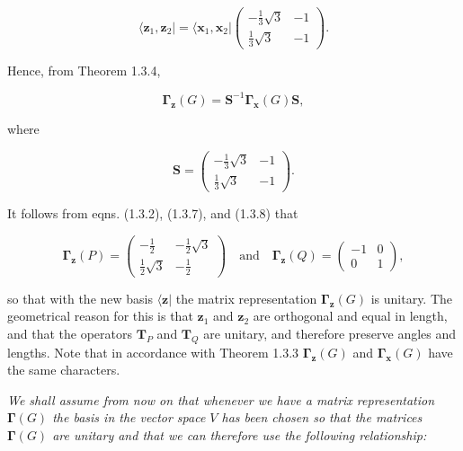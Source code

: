 \documentclass[11pt,a4paper,twoside,openright]{book}
\begin{document}
\begin{equation*}
\langle \mathbf{z}_{1}, \mathbf{z}_{2}| = \langle \mathbf{x}_{1}, \mathbf{x}_{2}| \begin{pmatrix} -\frac{1}{3}\sqrt{3} & -1 \\ \frac{1}{3}\sqrt{3} & -1 \end{pmatrix}. \tag{1.3.6}
\end{equation*}

Hence, from Theorem 1.3.4,

\begin{equation*}
\boldsymbol{\Gamma}_{\mathbf{z}}(G) = \mathbf{S}^{-1}\boldsymbol{\Gamma}_{\mathbf{x}}(G)\mathbf{S}, \tag{1.3.7}
\end{equation*}

where

\begin{equation*}
\mathbf{S} = \begin{pmatrix} -\frac{1}{3}\sqrt{3} & -1 \\ \frac{1}{3}\sqrt{3} & -1 \end{pmatrix}. \tag{1.3.8}
\end{equation*}

It follows from eqns. (1.3.2), (1.3.7), and (1.3.8) that

\begin{equation*}
\boldsymbol{\Gamma}_{\mathbf{z}}(P) = \begin{pmatrix} -\frac{1}{2} & -\frac{1}{2}\sqrt{3} \\ \frac{1}{2}\sqrt{3} & -\frac{1}{2} \end{pmatrix} \quad \text{and} \quad \boldsymbol{\Gamma}_{\mathbf{z}}(Q) = \begin{pmatrix} -1 & 0 \\ 0 & 1 \end{pmatrix}, \tag{1.3.9}
\end{equation*}

so that with the new basis $\langle \mathbf{z}|$ the matrix representation $\boldsymbol{\Gamma}_{\mathbf{z}}(G)$ is unitary. The geometrical reason for this is that $\mathbf{z}_{1}$ and $\mathbf{z}_{2}$ are orthogonal and equal in length, and that the operators $\mathbf{T}_{P}$ and $\mathbf{T}_{Q}$ are unitary, and therefore preserve angles and lengths. Note that in accordance with Theorem 1.3.3 $\boldsymbol{\Gamma}_{\mathbf{z}}(G)$ and $\boldsymbol{\Gamma}_{\mathbf{x}}(G)$ have the same characters.

\textit{We shall assume from now on that whenever we have a matrix representation $\boldsymbol{\Gamma}(G)$ the basis in the vector space $V$ has been chosen so that the matrices $\boldsymbol{\Gamma}(G)$ are unitary and that we can therefore use the following relationship:}
\end{document}
